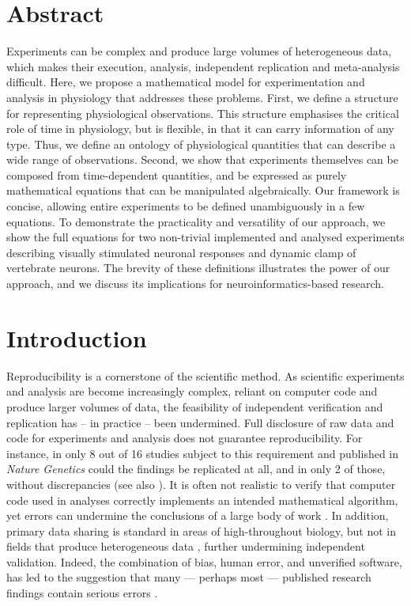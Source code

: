
\section*{Abstract}

Experiments can be complex and produce large volumes of heterogeneous
data, which makes their execution, analysis, independent replication
and meta-analysis difficult. Here, we propose a mathematical model for
experimentation and analysis in physiology that addresses these
problems. First, we define a structure for representing physiological
observations. This structure emphasises the critical role of time in
physiology, but is flexible, in that it can carry information of any
type. Thus, we define an ontology of physiological quantities that can
describe a wide range of observations. Second, we show that
experiments themselves can be composed from time-dependent quantities,
and be expressed as purely mathematical equations that can be
manipulated algebraically. Our framework is concise, allowing entire
experiments to be defined unambiguously in a few equations. To
demonstrate the practicality and versatility of our approach, we show
the full equations for two non-trivial implemented and analysed
experiments describing visually stimulated neuronal responses and
dynamic clamp of vertebrate neurons. The brevity of these definitions
illustrates the power of our approach, and we discuss its implications
for neuroinformatics-based research.

\pagebreak

\section*{Introduction}

Reproducibility is a cornerstone of the scientific method. As
scientific experiments and analysis are become increasingly complex,
reliant on computer code and produce larger volumes of data, the
feasibility of independent verification and replication has -- in
practice -- been undermined. Full disclosure of raw data and code for
experiments and analysis does not guarantee reproducibility.  For
instance, in only 8 out of 16 studies subject to this requirement and
published in \emph{Nature Genetics} could the findings be replicated
at all, and in only 2 of those, without discrepancies
\cite{Ioannidis2008} (see also \cite{Baggerly2009,
  McCullough2007}). It is often not realistic to verify that computer
code used in analyses correctly implements an intended mathematical
algorithm, yet errors can undermine the conclusions of a
large body of work \cite{Chang2006}.  In addition, primary data
sharing is standard in areas of high-throughout biology, but
not in fields that produce heterogeneous data \cite{Gardner2005},
further undermining independent validation.  Indeed, the combination
of bias, human error, and unverified software, has led to the
suggestion that many --- perhaps most --- published research findings
contain serious errors \cite{Ioannidis2005, Merali2010}.

